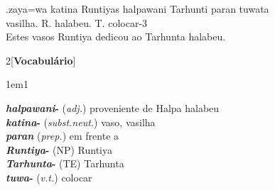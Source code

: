 \exg.zaya=wa katina Runtiyas halpawani Tarhunti paran tuwata\\
\Det{}\Acu{}\Pl{} vasilha.\Neut{}\Acu{}\Pl{} R.\Com{}\Nom{}\Sg{} halabeu.\Com{}\Dat{}\Sg{} T.\Com{}\Dat{}\Sg{} \Prep{} colocar-3\Sg\\
Estes vasos Runtiya dedicou ao Tarhunta halabeu.

\vspace{1cm}
\begin{multicols}{2}[\noindent\textbf{Vocabulário}]
	\begin{hangparas}{1em}{1}
		\raggedright%
		\textbf{\emph{halpawani}-} (\emph{adj.}) \tabto{1em} proveniente de Halpa \tabto{1em} halabeu\\
		\textbf{\emph{katina}-} (\emph{subst.neut.}) \tabto{1em} vaso, vasilha\\
		\textbf{\emph{paran}} (\emph{prep.}) \tabto{1em} em frente a\\
		\textbf{\emph{Runtiya}-} (NP) \tabto{1em} Runtiya\\
		\textbf{\emph{Tarhunta}-} (TE) \tabto{1em} Tarhunta\\
		\textbf{\emph{tuwa}-} (\emph{v.t.}) \tabto{1em} colocar\\
	\end{hangparas}
\end{multicols}
